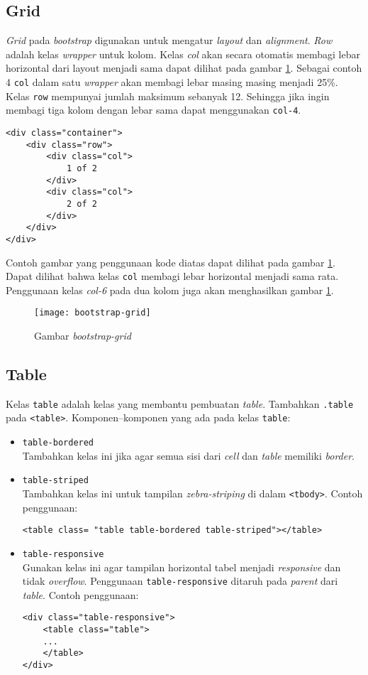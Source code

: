 \subsection{Grid} 
\textit{Grid} pada \textit{bootstrap} digunakan untuk mengatur \textit{layout} dan \textit{alignment}. \textit{Row} adalah kelas \textit{wrapper} untuk kolom. Kelas \textit{col} akan secara otomatis membagi lebar horizontal dari layout menjadi sama dapat dilihat pada gambar \ref{fig:bootstrap-grid}. Sebagai contoh 4 \texttt{col} dalam satu \textit{wrapper} akan membagi lebar masing masing menjadi 25\%. Kelas \texttt{row} mempunyai jumlah maksimum sebanyak 12. Sehingga jika ingin membagi tiga kolom dengan lebar sama dapat menggunakan \texttt{col-4}.
\begin{lstlisting}
<div class="container">
	<div class="row">
		<div class="col">
			1 of 2
		</div>
		<div class="col">
			2 of 2
		</div>
	</div>
</div>
\end{lstlisting}
Contoh gambar yang penggunaan kode diatas dapat dilihat pada gambar \ref{fig:bootstrap-grid}. Dapat dilihat bahwa kelas \texttt{col} membagi lebar horizontal menjadi sama rata. Penggunaan kelas \textit{col-6} pada dua kolom juga akan menghasilkan gambar \ref{fig:bootstrap-grid}.
\begin{figure}[H]
	\centering
	\texttt{[image: bootstrap-grid]}  	
	\caption[Gambar bootstrap-grid]{Gambar \textit{bootstrap-grid}}
	\label{fig:bootstrap-grid}  
\end{figure}


\subsection{Table}
Kelas \texttt{table} adalah kelas yang membantu pembuatan \textit{table}. Tambahkan \texttt{.table} pada \texttt{<table>}. Komponen--komponen yang ada pada kelas \texttt{table}:

\begin{itemize}
	\item \texttt{table-bordered} \\
	Tambahkan kelas ini jika agar semua sisi dari \textit{cell} dan \textit{table} memiliki \textit{border}.
	
	\item \texttt{table-striped} \\ 
	Tambahkan kelas ini untuk tampilan \textit{zebra-striping} di dalam \texttt{<tbody>}. Contoh penggunaan:
	\begin{lstlisting}
<table class= "table table-bordered table-striped"></table>
	\end{lstlisting}
	
	\item \texttt{table-responsive} \\ 
	Gunakan kelas ini agar tampilan horizontal tabel menjadi \textit{responsive} dan tidak \textit{overflow}. Penggunaan \texttt{table-responsive} ditaruh pada \textit{parent} dari \textit{table}. Contoh penggunaan:
	\begin{lstlisting}
<div class="table-responsive">
	<table class="table">
	...
	</table>
</div>	
	\end{lstlisting} 
\end{itemize}
